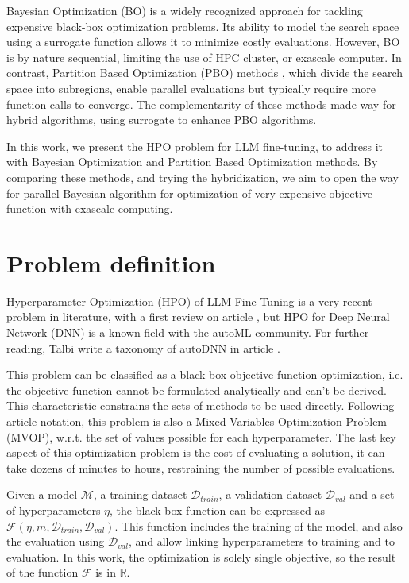 \documentclass[runningheads]{llncs}
\begin{document}
Bayesian Optimization (BO) \cite{shahriari_taking_2016} is a widely recognized approach for tackling expensive black-box optimization problems. Its ability to model the search space using a surrogate function allows it to minimize costly evaluations. However, BO is by nature sequential, limiting the use of HPC cluster, or exascale computer.
In contrast, Partition Based Optimization (PBO)  methods \cite{nakib_deterministic_2017,munos_optimistic_2011}, which divide the search space into subregions, enable parallel evaluations but typically require more function calls to converge. The complementarity of these methods made way for hybrid algorithms, using surrogate to enhance PBO algorithms.

In this work, we present the HPO problem for LLM fine-tuning, to address it with Bayesian Optimization and Partition Based Optimization  methods. By comparing these methods, and trying the hybridization, we aim to open the way for parallel Bayesian algorithm for optimization of very expensive objective function with exascale computing.

\newcommand{\Dtrain}{\mathcal{D}_{train}}
\newcommand{\Dval}{\mathcal{D}_{val}}
\newcommand{\model}{\mathcal{M}}

\section{Problem definition}
\label{sec:pbm}

Hyperparameter Optimization (HPO) of LLM Fine-Tuning is a very recent problem in literature, with a first review on article \cite{LiuEmpirical2021}, but HPO for Deep Neural Network (DNN) is a known field with the autoML community. For further reading, Talbi write a taxonomy of autoDNN in article \cite{talbi_automated_2021}.

This problem can be classified as a black-box objective function optimization, i.e. the objective function cannot be formulated analytically and can't be derived. This characteristic constrains the sets of methods to be used directly. Following article \cite{talbi_metaheuristics_2024} notation, this problem is also a Mixed-Variables Optimization Problem (MVOP), w.r.t. the set of values possible for each hyperparameter. The last key aspect of this optimization problem is the cost of evaluating a solution, it can take dozens of minutes to hours, restraining the number of possible evaluations.

Given a model $\mathcal M$, a training dataset $\Dtrain$, a validation dataset $\Dval$ and a set of hyperparameters $\eta$, the black-box function can be expressed as $  \mathcal F(\eta, m,\mathcal{D}_{train},\mathcal{D}_{val})$. This function includes the training of the model, and also the evaluation using $\Dval$, and allow linking hyperparameters to training and to evaluation. In this work, the optimization is solely single objective, so the result of the function $\mathcal F$ is in $\mathbb{R}$.
\end{document}
